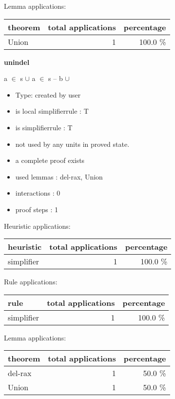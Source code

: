 \documentclass[a4paper]{article}
\begin{document}
Lemma applications:

\begin{supertabular}{l|r|r}
theorem	        & total applications & percentage \\ \hline
Union & 1 & 100.0 \% \\

\end{supertabular}
\pagebreak

{\LARGE\bf unindel}\label{lemma-unindel}

\medskip

 \Fol \Not a $\in$ s $\cup$  \Imp \Not a $\in$ s -- b $\cup$ 

\begin{itemize}

\item Type: created by user

\item is local simplifierrule : T
\item is simplifierrule : T
\item not used by any units in proved state.
\item       a complete proof exists
\item       used lemmas  : del-rax, Union
\item       interactions : 0
\item       proof steps  : 1
\end{itemize}

\medskip


Heuristic applications:

\begin{supertabular}{l|r|r}
heuristic	& total applications & percentage \\ \hline
simplifier & 1 & 100.0 \% \\

\end{supertabular}

Rule applications:

\begin{supertabular}{l|r|r}
rule	        & total applications & percentage \\ \hline
simplifier & 1 & 100.0 \% \\

\end{supertabular}

Lemma applications:

\begin{supertabular}{l|r|r}
theorem	        & total applications & percentage \\ \hline
del-rax & 1 & 50.0 \% \\
Union & 1 & 50.0 \% \\

\end{supertabular}
\pagebreak
\end{document}

